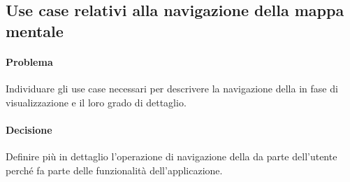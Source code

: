 \subsection{Use case relativi alla navigazione della mappa mentale}
\paragraph{Problema} Individuare gli use case necessari per descrivere la navigazione della  in fase di visualizzazione e il loro grado di dettaglio.
\paragraph{Decisione} Definire più in dettaglio l'operazione di navigazione della  da parte dell'utente perché fa parte delle funzionalità dell'applicazione.
